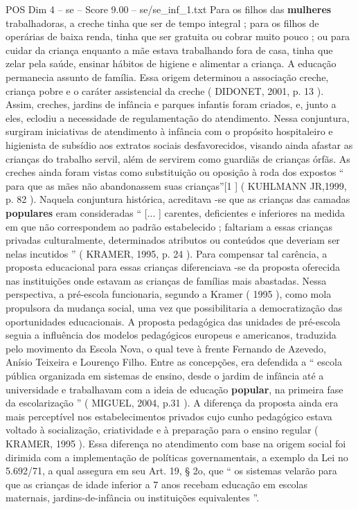 \begin{textsample}{POS Dim 4 – se – Score 9.00 – se/se\_inf\_1.txt}
Para os filhos das \textbf{mulheres} trabalhadoras, a creche tinha que ser de tempo integral ; para os filhos de operárias de baixa renda, tinha que ser gratuita ou cobrar muito pouco ; ou para cuidar da criança enquanto a mãe estava trabalhando fora de casa, tinha que zelar pela saúde, ensinar hábitos de higiene e alimentar a criança.
A educação permanecia assunto de família.
Essa origem determinou a associação creche, criança pobre e o caráter assistencial da creche ( DIDONET, 2001, p. 13 ).
Assim, creches, jardins de infância e parques infantis foram criados, e, junto a eles, eclodiu a necessidade de regulamentação do atendimento.
Nessa conjuntura, surgiram iniciativas de atendimento à infância com o propósito hospitaleiro e higienista de subsídio aos extratos sociais desfavorecidos, visando ainda afastar as crianças do trabalho servil, além de servirem como guardiãs de crianças órfãs.
As creches ainda foram vistas como substituição ou oposição à roda dos expostos “ para que as mães não abandonassem suas crianças”[1 ] ( KUHLMANN JR,1999, p. 82 ).
Naquela conjuntura histórica, acreditava -se que as crianças das camadas \textbf{populares} eram consideradas “ [... ] carentes, deficientes e inferiores na medida em que não correspondem ao padrão estabelecido ; faltariam a essas crianças privadas culturalmente, determinados atributos ou conteúdos que deveriam ser nelas incutidos ” ( KRAMER, 1995, p. 24 ).
Para compensar tal carência, a proposta educacional para essas crianças diferenciava -se da proposta oferecida nas instituições onde estavam as crianças de famílias mais abastadas.
Nessa perspectiva, a pré-escola funcionaria, segundo a Kramer ( 1995 ), como mola propulsora da mudança social, uma vez que possibilitaria a democratização das oportunidades educacionais.
A proposta pedagógica das unidades de pré-escola seguia a influência dos modelos pedagógicos europeus e americanos, traduzida pelo movimento da Escola Nova, o qual teve à frente Fernando de Azevedo, Anísio Teixeira e Lourenço Filho.
Entre as concepções, era defendida a “ escola pública organizada em sistemas de ensino, desde o jardim de infância até a universidade e trabalhavam com a ideia de educação \textbf{popular}, na primeira fase da escolarização ” ( MIGUEL, 2004, p.31 ).
A diferença da proposta ainda era mais perceptível nos estabelecimentos privados cujo cunho pedagógico estava voltado à socialização, criatividade e à preparação para o ensino regular ( KRAMER, 1995 ).
Essa diferença no atendimento com base na origem social foi dirimida com a implementação de políticas governamentais, a exemplo da Lei no 5.692/71, a qual assegura em seu Art. 19, § 2o, que “ os sistemas velarão para que as crianças de idade inferior a 7 anos recebam educação em escolas maternais, jardins-de-infância ou instituições equivalentes ”.

\end{textsample}
